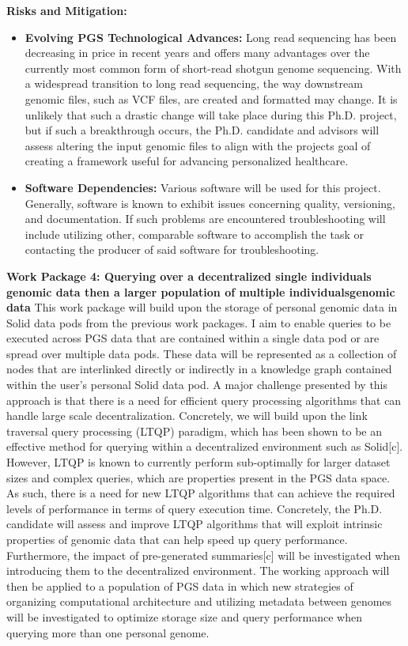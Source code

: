 \documentclass{article}
\begin{document}
\textbf{Risks and Mitigation:} 
\begin{itemize}
	\item \textbf{Evolving PGS Technological Advances:} Long read sequencing has been decreasing in price in recent years and offers many advantages over the currently most common form of short-read shotgun genome sequencing. With a widespread transition to long read sequencing, the way downstream genomic files, such as VCF files, are created and formatted may change. It is unlikely that such a drastic change will take place during this Ph.D. project, but if such a breakthrough occurs, the Ph.D. candidate and advisors will assess altering the input genomic files to align with the project\textquotesingle s goal of creating a framework useful for advancing personalized healthcare.
	\item \textbf{Software Dependencies:} Various software will be used for this project. Generally, software is known to exhibit issues concerning quality, versioning, and documentation. If such problems are encountered troubleshooting will include utilizing other, comparable software to accomplish the task or contacting the producer of said software for troubleshooting.
\end{itemize}

\textbf{Work Package 4: Querying over a decentralized single individual\textquotesingle s genomic data then a larger population of multiple individuals\textquotesingle  genomic data}
This work package will build upon the storage of personal genomic data in Solid data pods from the previous work packages. I aim to enable queries to be executed across PGS data that are contained within a single data pod or are spread over multiple data pods. These data will be represented as a collection of nodes that are interlinked directly or indirectly in a knowledge graph contained within the user’s personal Solid data pod. A major challenge presented by this approach is that there is a need for efficient query processing algorithms that can handle large scale decentralization. Concretely, we will build upon the link traversal query processing (LTQP) paradigm, which has been shown to be an effective method for querying within a decentralized environment such as Solid[c]. However, LTQP is known to currently perform sub-optimally for larger dataset sizes and complex queries, which are properties present in the PGS data space. As such, there is a need for new LTQP algorithms that can achieve the required levels of performance in terms of query execution time. Concretely, the Ph.D. candidate will assess and improve LTQP algorithms that will exploit intrinsic properties of genomic data that can help speed up query performance. Furthermore, the impact of pre-generated summaries[c] will be investigated when introducing them to the decentralized environment. The working approach will then be applied to a population of PGS data in which new strategies of organizing computational architecture and utilizing metadata between genomes will be investigated to optimize storage size and query performance when querying more than one personal genome.
\end{document}
